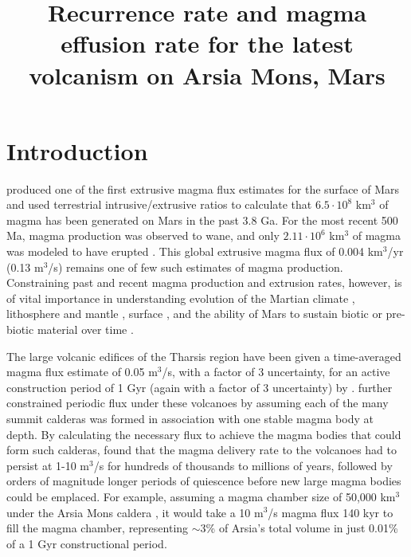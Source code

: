 \documentclass[12pt,letter]{article}
\title{Recurrence rate and magma effusion rate for the latest volcanism on Arsia Mons, Mars}
\date{}
\author{}
\begin{document}
\maketitle


\section{Introduction}

\citet{greeley1991magma} produced one of the first extrusive magma flux estimates for the surface of Mars and used terrestrial intrusive/extrusive ratios to calculate that $6.5\cdot 10^8$ km$^3$ of magma has been generated on Mars in the past 3.8 Ga. For the most recent 500 Ma, magma production was observed to wane, and only $2.11\cdot 10^6$ km$^3$ of magma was modeled to have erupted \citep{greeley1991magma}. This global extrusive magma flux of 0.004 km$^3$/yr (0.13 m$^3$/s) remains one of few such estimates of magma production. Constraining past and recent magma production and extrusion rates, however, is of vital importance in understanding evolution of the Martian climate \citep[e.g.]{mouginis2008lava,halevy2014episodic}, lithosphere and mantle \citep{grott2013long}, surface \citep{wilson1994mars}, and the ability of Mars to sustain biotic or pre-biotic material over time \citep{scanlon2015volcanism}.

The large volcanic edifices of the Tharsis region have been given a time-averaged magma flux estimate of 0.05 m$^3$/s, with a factor of 3 uncertainty, for an active construction period of 1 Gyr (again with a factor of 3 uncertainty) by \citet{wilson2001evidence}. \citet{wilson2001evidence} further constrained periodic flux under these volcanoes by assuming each of the many summit calderas was formed in association with one stable magma body at depth. By calculating the necessary flux to achieve the magma bodies that could form such calderas, \citet{wilson2001evidence} found that the magma delivery rate to the volcanoes had to persist at 1-10 m$^3$/s for hundreds of thousands to millions of years, followed by orders of magnitude longer periods of quiescence before new large magma bodies could be emplaced. For example, assuming a magma chamber size of 50,000 km$^3$ under the Arsia Mons caldera \citep{wilson2001evidence}, it would take a 10 m$^3$/s magma flux 140 kyr to fill the magma chamber, representing $\sim$3\% of Arsia's total volume in just 0.01\% of a 1 Gyr constructional period.
\end{document}
